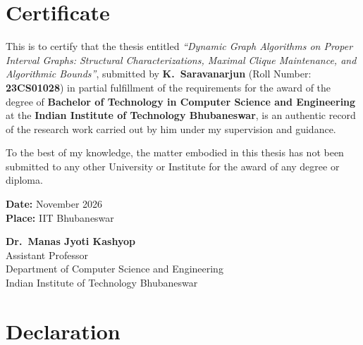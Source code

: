 

\chapter*{Certificate}

This is to certify that the thesis entitled
\textit{``Dynamic Graph Algorithms on Proper Interval Graphs: Structural Characterizations, Maximal Clique Maintenance, and Algorithmic Bounds''}, submitted by
\textbf{K.\ Saravanarjun} (Roll Number: \textbf{23CS01028}) in partial fulfillment of the requirements
for the award of the degree of \textbf{Bachelor of Technology in Computer Science and Engineering} at the
\textbf{Indian Institute of Technology Bhubaneswar}, is an authentic record of the research work carried out
by him under my supervision and guidance.

To the best of my knowledge, the matter embodied in this thesis has not been submitted to any other University or Institute for the award of any degree or diploma.

\vspace{2.5cm}

\noindent
\begin{minipage}[t]{0.5\textwidth}
    \textbf{Date:} November 2026\\
    \textbf{Place:} IIT Bhubaneswar
\end{minipage}
\hfill
\begin{minipage}[t]{0.45\textwidth}
    \raggedleft
    \textbf{Dr.\ Manas Jyoti Kashyop}\\
    Assistant Professor\\
    Department of Computer Science and Engineering\\
    Indian Institute of Technology Bhubaneswar
\end{minipage}

\clearpage


\chapter*{Declaration}

